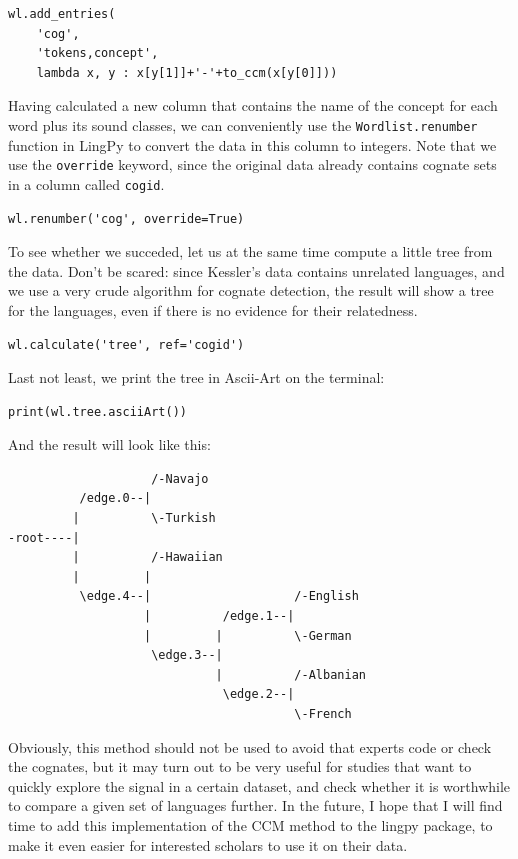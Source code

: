 \documentclass[
  english,
  a4paper,
  oneside,tablecaptionabove
]{scrbook}
\newcommand{\passthrough}[1]{#1}
\begin{document}
\begin{lstlisting}
wl.add_entries(
    'cog', 
    'tokens,concept', 
    lambda x, y : x[y[1]]+'-'+to_ccm(x[y[0]]))
\end{lstlisting}

Having calculated a new column that contains the name of the concept for
each word plus its sound classes, we can conveniently use the
\passthrough{\lstinline!Wordlist.renumber!} function in LingPy to
convert the data in this column to integers. Note that we use the
\passthrough{\lstinline!override!} keyword, since the original data
already contains cognate sets in a column called
\passthrough{\lstinline!cogid!}.

\begin{lstlisting}
wl.renumber('cog', override=True)
\end{lstlisting}

To see whether we succeded, let us at the same time compute a little
tree from the data. Don't be scared: since Kessler's data contains
unrelated languages, and we use a very crude algorithm for cognate
detection, the result will show a tree for the languages, even if there
is no evidence for their relatedness.

\begin{lstlisting}
wl.calculate('tree', ref='cogid')
\end{lstlisting}

Last not least, we print the tree in Ascii-Art on the terminal:

\begin{lstlisting}
print(wl.tree.asciiArt())
\end{lstlisting}

And the result will look like this:

\begin{lstlisting}
                    /-Navajo
          /edge.0--|
         |          \-Turkish
-root----|
         |          /-Hawaiian
         |         |
          \edge.4--|                    /-English
                   |          /edge.1--|
                   |         |          \-German
                    \edge.3--|
                             |          /-Albanian
                              \edge.2--|
                                        \-French
\end{lstlisting}

Obviously, this method should not be used to avoid that experts code or
check the cognates, but it may turn out to be very useful for studies
that want to quickly explore the signal in a certain dataset, and check
whether it is worthwhile to compare a given set of languages further. In
the future, I hope that I will find time to add this implementation of
the CCM method to the lingpy package, to make it even easier for
interested scholars to use it on their data.
\end{document}
